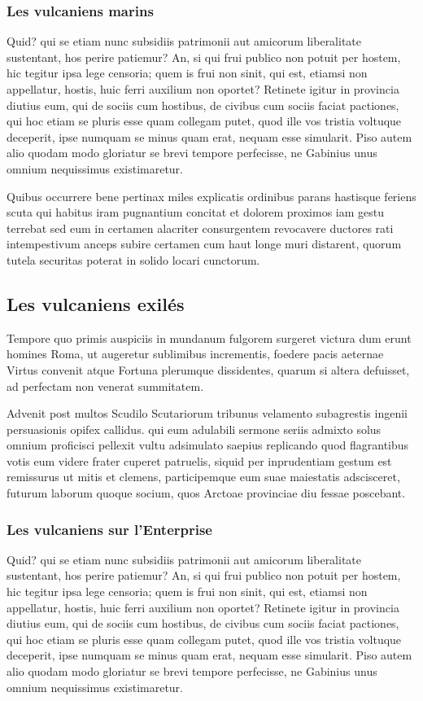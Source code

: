 \documentclass{framatexclass}
\begin{document}
\subsubsection{Les vulcaniens marins}
Quid? qui se etiam nunc subsidiis patrimonii aut amicorum liberalitate sustentant, hos perire patiemur? An, si qui frui publico non potuit per hostem, hic tegitur ipsa lege censoria; quem is frui non sinit, qui est, etiamsi non appellatur, hostis, huic ferri auxilium non oportet? Retinete igitur in provincia diutius eum, qui de sociis cum hostibus, de civibus cum sociis faciat pactiones, qui hoc etiam se pluris esse quam collegam putet, quod ille vos tristia voltuque deceperit, ipse numquam se minus quam erat, nequam esse simularit. Piso autem alio quodam modo gloriatur se brevi tempore perfecisse, ne Gabinius unus omnium nequissimus existimaretur.

Quibus occurrere bene pertinax miles explicatis ordinibus parans hastisque feriens scuta qui habitus iram pugnantium concitat et dolorem proximos iam gestu terrebat sed eum in certamen alacriter consurgentem revocavere ductores rati intempestivum anceps subire certamen cum haut longe muri distarent, quorum tutela securitas poterat in solido locari cunctorum.


\subsection{Les vulcaniens exilés}
Tempore quo primis auspiciis in mundanum fulgorem surgeret victura dum erunt homines Roma, ut augeretur sublimibus incrementis, foedere pacis aeternae Virtus convenit atque Fortuna plerumque dissidentes, quarum si altera defuisset, ad perfectam non venerat summitatem.

Advenit post multos Scudilo Scutariorum tribunus velamento subagrestis ingenii persuasionis opifex callidus. qui eum adulabili sermone seriis admixto solus omnium proficisci pellexit vultu adsimulato saepius replicando quod flagrantibus votis eum videre frater cuperet patruelis, siquid per inprudentiam gestum est remissurus ut mitis et clemens, participemque eum suae maiestatis adscisceret, futurum laborum quoque socium, quos Arctoae provinciae diu fessae poscebant.


\subsubsection{Les vulcaniens sur l'Enterprise}
Quid? qui se etiam nunc subsidiis patrimonii aut amicorum liberalitate sustentant, hos perire patiemur? An, si qui frui publico non potuit per hostem, hic tegitur ipsa lege censoria; quem is frui non sinit, qui est, etiamsi non appellatur, hostis, huic ferri auxilium non oportet? Retinete igitur in provincia diutius eum, qui de sociis cum hostibus, de civibus cum sociis faciat pactiones, qui hoc etiam se pluris esse quam collegam putet, quod ille vos tristia voltuque deceperit, ipse numquam se minus quam erat, nequam esse simularit. Piso autem alio quodam modo gloriatur se brevi tempore perfecisse, ne Gabinius unus omnium nequissimus existimaretur.
\end{document}
